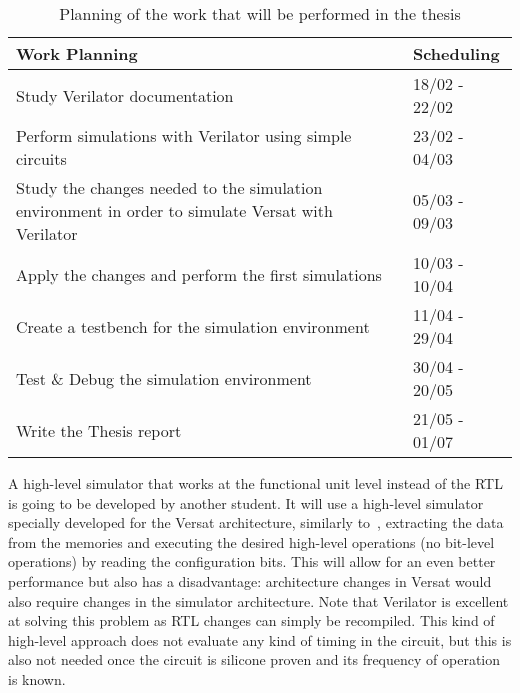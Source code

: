 \begin{table}[!htbp]
	\centering
	\caption{Planning of the work that will be performed in the thesis}
	\label{tab:planning}
	\begin{tabular}{|p{8cm}|l|}
		\hline
		\textbf{Work Planning}                                                                            & \textbf{Scheduling} \\
		\hline
		Study Verilator documentation                                                                     & 18/02 - 22/02       \\
		\hline
		Perform simulations with Verilator using simple circuits                                          & 23/02 - 04/03       \\
		\hline
		Study the changes needed to the simulation environment in order to simulate Versat with Verilator & 05/03 - 09/03       \\
		\hline
		Apply the changes and perform the first simulations                                               & 10/03 - 10/04       \\
		\hline
		Create a testbench for the simulation environment                                                 & 11/04 - 29/04       \\
		\hline
		Test \& Debug the simulation environment                                                          & 30/04 - 20/05       \\
		\hline
		Write the Thesis report                                                                           & 21/05 - 01/07       \\
		\hline
	\end{tabular}
\end{table}

A high-level simulator that works at the functional unit level instead of the
RTL is going to be developed by another student. It will use a high-level
simulator specially developed for the Versat architecture, similarly to~\cite{chen:CGRA}, extracting the data from the memories and executing the
desired high-level operations (no bit-level operations) by reading the
configuration bits. This will allow for an even better performance but also has
a disadvantage: architecture changes in Versat would also require changes in the
simulator architecture. Note that Verilator is excellent at solving this problem
as RTL changes can simply be recompiled. This kind of high-level approach does
not evaluate any kind of timing in the circuit, but this is also not needed once
the circuit is silicone proven and its frequency of operation is known.

